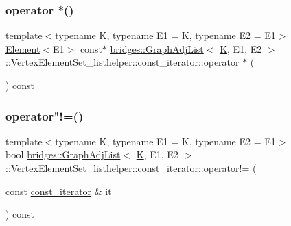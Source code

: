 \subsubsection{\texorpdfstring{operator $\ast$()}{operator *()}}
{\footnotesize\ttfamily template$<$typename K, typename E1 = K, typename E2 = E1$>$ \\
\mbox{\hyperlink{classbridges_1_1_element}{Element}}$<$E1$>$ const$\ast$ \mbox{\hyperlink{classbridges_1_1_graph_adj_list}{bridges\+::\+Graph\+Adj\+List}}$<$ \mbox{\hyperlink{namespacebridges_acfb0a4f7877d8f63de3e6862004c50edaa5f3c6a11b03839d46af9fb43c97c188}{K}}, E1, E2 $>$\+::Vertex\+Element\+Set\+\_\+listhelper\+::const\+\_\+iterator\+::operator $\ast$ (\begin{DoxyParamCaption}{ }\end{DoxyParamCaption}) const\hspace{0.3cm}{\ttfamily [inline]}}

\mbox{\label{classbridges_1_1_graph_adj_list_1_1_vertex_element_set__listhelper_1_1const__iterator_adec12879bc99de5fbeaa4b528f0479dc}} 
\subsubsection{\texorpdfstring{operator"!=()}{operator!=()}}
{\footnotesize\ttfamily template$<$typename K, typename E1 = K, typename E2 = E1$>$ \\
bool \mbox{\hyperlink{classbridges_1_1_graph_adj_list}{bridges\+::\+Graph\+Adj\+List}}$<$ \mbox{\hyperlink{namespacebridges_acfb0a4f7877d8f63de3e6862004c50edaa5f3c6a11b03839d46af9fb43c97c188}{K}}, E1, E2 $>$\+::Vertex\+Element\+Set\+\_\+listhelper\+::const\+\_\+iterator\+::operator!= (\begin{DoxyParamCaption}\item[{const \mbox{\hyperlink{classbridges_1_1_graph_adj_list_1_1_vertex_element_set__listhelper_1_1const__iterator}{const\+\_\+iterator}} \&}]{it }\end{DoxyParamCaption}) const\hspace{0.3cm}{\ttfamily [inline]}}

